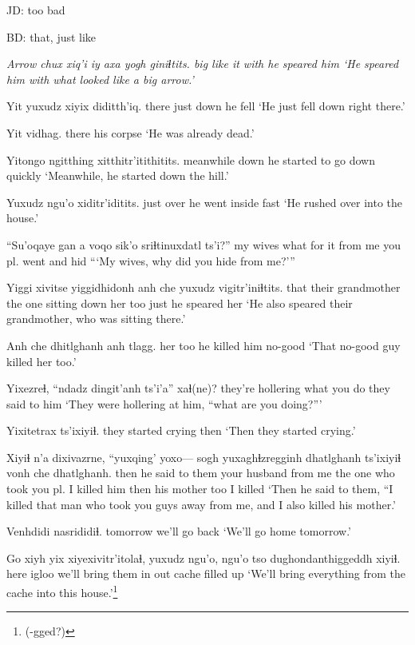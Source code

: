 \documentclass[12pt]{article}
\begin{document}
JD:  too bad

BD:
that, just like

\gll \em{Arrow} chux xiq'i iy axa {yogh giniɬtits.}
 {}     big  like  it with {he speared him}
\glt `He speared him with what looked like a big arrow.'
\glend

\gll Yit yuxudz xiyix diditth'iq. 
there just down  {he fell}
\glt `He just fell down right there.'
\glend

\gll Yit vidhag. 
there {his corpse}
\glt `He was already dead.'
\glend

\gll Yitongo   ngitthing xitthitr'itithitits.
meanwhile down      {he started to go down quickly}
\glt `Meanwhile, he started down the hill.'
\glend

\gll Yuxudz ngu'o xiditr'iditits.
just   over  {he went inside fast}
\glt `He rushed over into the house.'
\glend

\gll ``Su'oqaye gan  a voqo   sik'o   sriɬtinuxdatl    ts'i?'' 
{my wives} what {}  {for it} {from me} {you pl. went and hid      }
\glt ```My wives, why did you hide from me?'''
\glend

\gll Yiggi xivitse           yiggidhidonh         anh che yuxudz vigitr'iniɬtits. 
that  {their grandmother} {the one sitting down} her too just   {he speared her}
\glt `He also speared their grandmother, who was sitting there.'
\glend

\gll Anh che dhitlghanh anh tlagg.
her too {he killed}  him no-good
\glt `That no-good guy killed her too.'
\glend

\gll Yixezreɬ,         ``ndadz dingit'anh ts'i'a'' xaɬ(ne)?
{they're hollering}  what   {you do} {} {they said to him}
\glt `They were hollering at him, ``what are you doing?'''
\glend

\gll Yixitetrax          ts'ixiyiɬ.
{they started crying} then
\glt `Then they started crying.'
\glend

\gll Xiyiɬ n'a dixivazrne,     ``yuxqing'     yoxo--- sogh    yuxaghɬzregginh          dhatlghanh   ts'ixiyiɬ vonh       che dhatlghanh.
then {}     {he said to them}  {your husband} {}  {from me} {the one who took you pl.} {I killed him} then      {his mother} too {I killed}
\glt `Then he said to them, ``I killed that man who took you guys away from me, and I also killed his mother.'
\glend

\gll Venhdidi nasrididiɬ.
tomorrow  {we'll go back}
\glt `We'll go home tomorrow.'
\glend

\gll Go   {xiyh yix} xiyexivitr'itolaɬ, yuxudz ngu'o, ngu'o tso {dughondanthiggeddh} xiyiɬ.
here igloo    {we'll bring them in} {}       out  {}       cache {filled up}
\glt `We'll bring everything from the cache into this house.'\footnote{(-gged?)}
\glend
\end{document}
